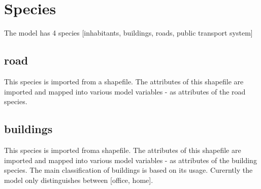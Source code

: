 \documentclass[]{book}
\theoremstyle{definition}
\theoremstyle{definition}
\theoremstyle{definition}
\theoremstyle{remark}
\begin{document}
\hypertarget{species}{%
\chapter{Species}\label{species}}

The model has 4 species {[}inhabitants, buildings, roads, public
transport system{]}

\hypertarget{road}{%
\section{road}\label{road}}

This species is imported from a shapefile. The attributes of this
shapefile are imported and mapped into various model variables - as
attributes of the road species.

\hypertarget{buildings}{%
\section{buildings}\label{buildings}}

This species is imported froma shapefile. The attributes of this
shapefile are imported and mapped into various model variables - as
attributes of the building species. The main classification of buildings
is based on its usage. Curerntly the model only distinguishes between
{[}office, home{]}.

\printindex
\end{document}
